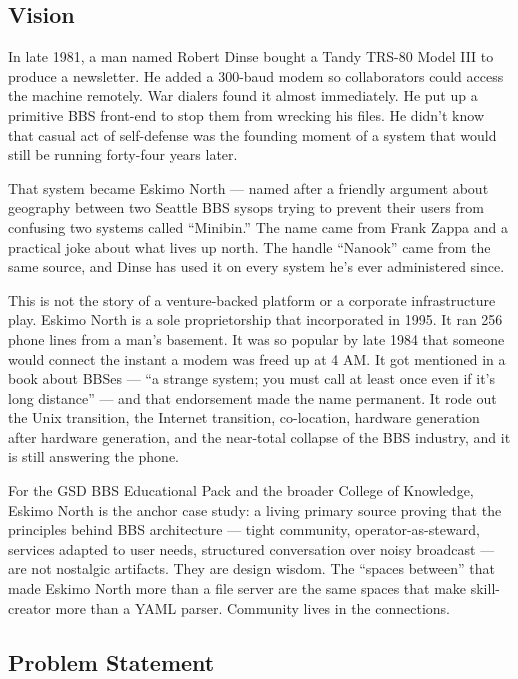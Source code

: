 \documentclass[11pt,letterpaper]{article}
\begin{document}
\subsection{Vision}

In late 1981, a man named Robert Dinse bought a Tandy TRS-80 Model III to produce a newsletter. He added a 300-baud modem so collaborators could access the machine remotely. War dialers found it almost immediately. He put up a primitive BBS front-end to stop them from wrecking his files. He didn't know that casual act of self-defense was the founding moment of a system that would still be running forty-four years later.

That system became Eskimo North --- named after a friendly argument about geography between two Seattle BBS sysops trying to prevent their users from confusing two systems called ``Minibin.'' The name came from Frank Zappa and a practical joke about what lives up north. The handle ``Nanook'' came from the same source, and Dinse has used it on every system he's ever administered since.

This is not the story of a venture-backed platform or a corporate infrastructure play. Eskimo North is a sole proprietorship that incorporated in 1995. It ran 256 phone lines from a man's basement. It was so popular by late 1984 that someone would connect the instant a modem was freed up at 4 AM. It got mentioned in a book about BBSes --- ``a strange system; you must call at least once even if it's long distance'' --- and that endorsement made the name permanent. It rode out the Unix transition, the Internet transition, co-location, hardware generation after hardware generation, and the near-total collapse of the BBS industry, and it is still answering the phone.

For the GSD BBS Educational Pack and the broader College of Knowledge, Eskimo North is the anchor case study: a living primary source proving that the principles behind BBS architecture --- tight community, operator-as-steward, services adapted to user needs, structured conversation over noisy broadcast --- are not nostalgic artifacts. They are design wisdom. The ``spaces between'' that made Eskimo North more than a file server are the same spaces that make skill-creator more than a YAML parser. Community lives in the connections.

\subsection{Problem Statement}
\end{document}
